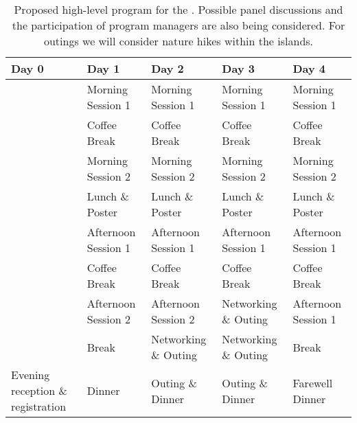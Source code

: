 \begin{table}[!]
  \centering
  \footnotesize{
  \begin{tabular}{|p{2.5cm}|p{2.5cm}|p{2.5cm}|p{2.5cm}|p{2.5cm}|}
    \hline 
    \rowcolor{Gray}
    \bfseries Day 0& \bfseries Day 1&\bfseries Day 2 &\bfseries Day 3 &\bfseries Day 4\\
    \hline
                   &Morning Session 1&Morning Session 1&Morning Session 1&Morning Session 1\\
    \hline
                   &Coffee Break&Coffee Break&Coffee Break&Coffee Break\\
    \hline    
                   &Morning Session 2&Morning Session 2&Morning Session 2&Morning Session 2\\
    \hline
                   &Lunch \& Poster &Lunch \& Poster&Lunch \&
                                                      Poster&Lunch \& Poster\\
    \hline
                   &Afternoon Session 1&Afternoon Session 1&Afternoon Session 1&Afternoon Session 1\\
    \hline
                   &Coffee Break&Coffee Break&Coffee Break&Coffee Break\\
    \hline
                   &Afternoon Session 2&Afternoon Session 2&Networking \& Outing&Afternoon Session 1\\
    \hline
                   &Break&Networking \& Outing&Networking \& Outing&Break\\
    \hline
    Evening reception \& registration&Dinner&Outing \& Dinner&Outing \&
                                                               Dinner&Farewell Dinner\\
    \hline        
  \end{tabular}
  }
  \caption{Proposed high-level program for the \sympe. Possible panel
    discussions and the participation of program managers are also
    being considered. For outings we will consider nature hikes within
    the islands.}
  \label{tab:symp}
\end{table}
